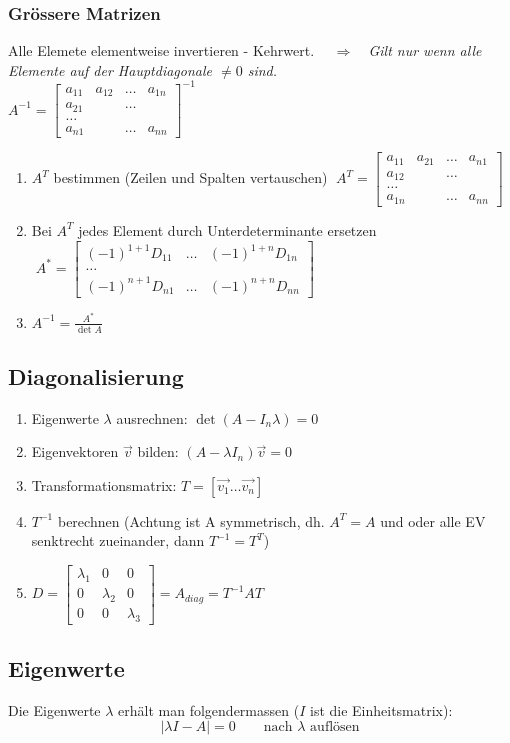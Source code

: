 \subsubsection{Grössere Matrizen}
Alle Elemete elementweise invertieren - Kehrwert. $\quad \Rightarrow \quad $\textit{Gilt nur wenn alle Elemente auf der Hauptdiagonale $\neq 0$ sind.}\\

$A^{-1}= \begin{bmatrix}
a_{11} & a_{12}& \ldots & a_{1n}\\
a_{21}& &\ldots & \\
\ldots \\
a_{n1} & & \ldots & a_{nn}    			
\end{bmatrix}^{-1}$

\begin{enumerate}
	\item $A^T$ bestimmen (Zeilen und Spalten vertauschen)
	$ \; A^{T}= \begin{bmatrix}
	a_{11} & a_{21}& \ldots & a_{n1}\\
	a_{12}& &\ldots & \\
	\ldots \\
	a_{1n} & & \ldots & a_{nn}    			
	\end{bmatrix}$	
	\item Bei $A^T$ jedes Element durch Unterdeterminante ersetzen
	$\;A^*=	\begin{bmatrix}
	(-1)^{1+1}D_{11} &  \ldots	& (-1)^{1+n} D_{1n}\\
	\ldots\\
	(-1)^{n+1} D_{n1}& \ldots  & (-1)^{n+n} D_{nn}
	\end{bmatrix}$
	\item $A^{-1} = \frac{A^*}{\det A}$ 
\end{enumerate}


	\subsection{Diagonalisierung}
	\begin{enumerate}
		\item Eigenwerte $\lambda$ ausrechnen: $\det (A - I_n \lambda)=0$
		\item Eigenvektoren $\vec{v}$ bilden: $(A- \lambda I_n)\vec{v}=0$
		\item Transformationsmatrix: $T= [\vec{v_1} \ldots \vec{v_n}]$
		\item $T^{-1}$ berechnen (Achtung ist A symmetrisch, dh. $A^T=A$ und
		oder alle EV senktrecht zueinander, dann $T^{-1}=T^T$)
		\item $D=\begin{bmatrix}
		\lambda_1 &0 &0\\
		0& \lambda_2 &0\\
		0& 0& \lambda_3
		\end{bmatrix} = A_{diag} = T^{-1}AT$
	\end{enumerate}
	
	\subsection{Eigenwerte}
	Die Eigenwerte $\lambda$ erhält man folgendermassen ($I$ ist die Einheitsmatrix):
	\[ |\lambda I - A| = 0 \qquad \text{nach } \lambda \text{ auflösen} \]

